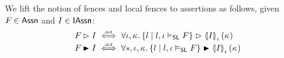 We lift the notion of fences and local fences to
assertions as follows, given $F_{} \in \textsf{Assn}$ and $I \in
\textsf{IAssn}$:
\begin{align*}
  \fenceAss{} \fences I &\iffdef \for{\lenv,\ca{}}
  \{ l \mid l, \lenv \slsat F \} \fences \semI[\lenv]{I}(\ca{})\\
  \fenceAss{} \strictfences I &\iffdef \for{s,\lenv,\ca{}}
  \{ l \mid l, \lenv \slsat F \} \strictfences \semI[\lenv]{I}(\ca{})
\end{align*}




